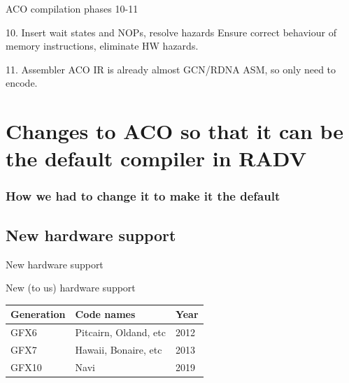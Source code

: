 \documentclass[aspectratio=169,t,xcolor=table]{beamer}
\begin{document}
\begin{frame}{ACO compilation phases 10-11}

    \footnotesize

    \begin{block}{10. Insert wait states and NOPs, resolve hazards}
        Ensure correct behaviour of memory instructions, eliminate HW hazards.
    \end{block}

    \begin{block}{11. Assembler}
        ACO IR is already almost GCN/RDNA ASM, so only need to encode.
    \end{block}

\end{frame}

\section{Changes to ACO so that it can be the default compiler in RADV}

\begin{frame}{}
    \frametitle{How we had to change it to make it the default}
\end{frame}

\subsection{New hardware support}

\begin{frame}{New hardware support}
\end{frame}

\begin{frame}{New (to us) hardware support}
    \normalsize
    \begin{table}[]
        \centering
        
        \renewcommand{\arraystretch}{1.5}
        \setlength{\tabcolsep}{10pt}
        
        {
            \begin{tabular}{ p{2cm}p{8cm}p{2.5cm}  }
                \toprule 
                \textbf{Generation} & \textbf{Code names} & \textbf{Year} \\
                \midrule
                GFX6 & Pitcairn, Oldand, etc & 2012 \\
                GFX7 & Hawaii, Bonaire, etc & 2013 \\
                GFX10 & Navi & 2019 \\
                \bottomrule
            \end{tabular}
        }
    \end{table}
\end{frame}
\end{document}
